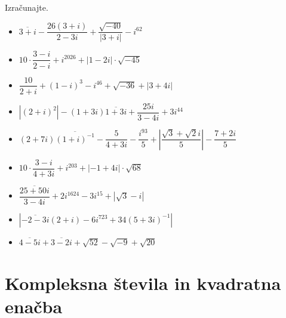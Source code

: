             \begin{naloga}
                Izračunajte.
                
                    \begin{itemize} 
                        \item $ \overline{3+i} - \dfrac{26(3+i)}{2-3i} + \dfrac{\sqrt{-40}}{\left| 3+i \right|} -i^{62} $ 
                        \item $ 10\cdot\dfrac{3-i}{2-i} + i^{2026}+\left| 1-2i \right|\cdot\sqrt{-45} $ 
                        \item $ \dfrac{10}{2+i} + \left(1-i\right)^3 - i^{46}+\sqrt{-36}+\left| 3+4i \right| $ 
                        \item $ \left|\left(2+i\right)^2\right|-\left(1+3i\right)\overline{1+3i}+\dfrac{25i}{3-4i}+3i^{44} $ 
                        \item $ \left(2+7i\right)\overline{\left(1+i\right)^{-1}}-\dfrac{5}{4+3i}-\dfrac{i^{93}}{5}+\left|\dfrac{\sqrt{3}+\sqrt{2}i}{5}\right|-\dfrac{7+2i}{5} $ 
                        \item $ 10\cdot\dfrac{3-i}{4+3i}+i^{203} +\left|-1+4i\right|\cdot\sqrt{68} $ 
                        \item $ \dfrac{\overline{25+50i}}{3-4i}+2i^{1624}-3i^{15}+\left|\sqrt{3}-i\right| $ 
                        \item $ \left|\overline{-2-3i}\left(2+i\right)-6i^{723}+34\left(5+3i\right)^{-1}\right| $ 
                        \item $ \overline{4-5i}+\overline{3-2i}+\sqrt{52}-\sqrt{-9}+\sqrt{20} $ 
                    \end{itemize}
            \end{naloga}


        
\newpage


    \section{Kompleksna števila in kvadratna enačba}


    
\newpage


